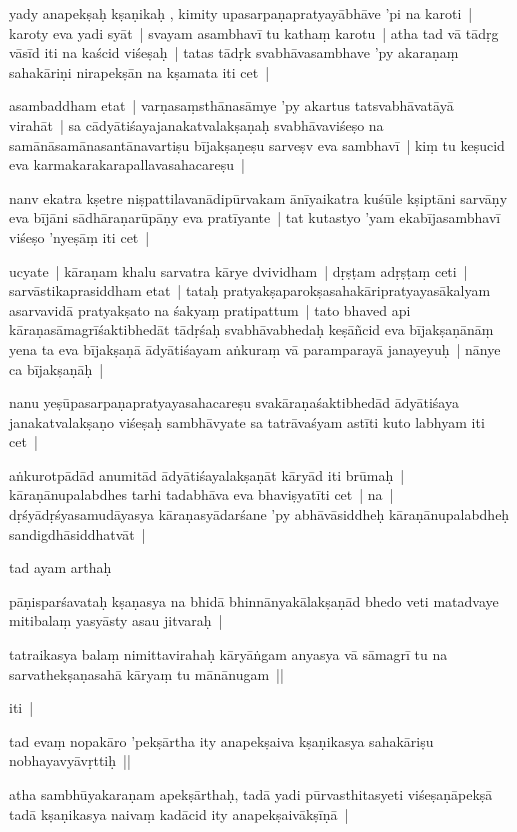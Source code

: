 \documentclass[article,12pt,a4paper]{memoir}
\begin{document}
	  \pstart yady anapekṣaḥ kṣaṇikaḥ , kimity upasarpaṇapratyayābhāve 'pi na karoti | karoty eva yadi syāt | svayam asambhavī tu kathaṃ karotu | atha tad vā tādṛg vāsīd iti na kaścid viśeṣaḥ | tatas tādṛk svabhāvasambhave 'py akaraṇaṃ sahakāriṇi nirapekṣān na kṣamata iti cet |
	\pend
      

	  \pstart asambaddham etat | varṇasaṃsthānasāmye 'py akartus tatsvabhāvatāyā virahāt | sa cādyātiśayajanakatvalakṣaṇaḥ svabhāvaviśeṣo na samānāsamānasantānavartiṣu bījakṣaṇeṣu sarveṣv eva sambhavī | kiṃ tu keṣucid eva karmakarakarapallavasahacareṣu |
	\pend
      

	  \pstart nanv ekatra kṣetre niṣpattilavanādipūrvakam ānīyaikatra kuśūle kṣiptāni sarvāṇy eva bījāni sādhāraṇarūpāṇy eva pratīyante | tat kutastyo 'yam ekabījasambhavī viśeṣo 'nyeṣāṃ iti cet | 
	\pend
      

	  \pstart ucyate | kāraṇam khalu sarvatra kārye dvividham | dṛṣṭam adṛṣṭaṃ ceti | sarvāstikaprasiddham etat | tataḥ pratyakṣaparokṣasahakāripratyayasākalyam asarvavidā pratyakṣato na śakyaṃ pratipattum | tato bhaved api kāraṇasāmagrīśaktibhedāt tādṛśaḥ svabhāvabhedaḥ keṣāñcid eva bījakṣaṇānāṃ yena ta eva bījakṣaṇā ādyātiśayam aṅkuraṃ vā paramparayā janayeyuḥ | nānye ca bījakṣaṇāḥ |
	\pend
      

	  \pstart nanu yeṣūpasarpaṇapratyayasahacareṣu svakāraṇaśaktibhedād ādyātiśaya janakatvalakṣaṇo viśeṣaḥ sambhāvyate sa tatrāvaśyam astīti kuto labhyam iti cet | 
	\pend
      

	  \pstart aṅkurotpādād anumitād ādyātiśayalakṣaṇāt kāryād iti brūmaḥ | kāraṇānupalabdhes tarhi tadabhāva eva bhaviṣyatīti cet | na | dṛśyādṛśyasamudāyasya kāraṇasyādarśane 'py abhāvāsiddheḥ kāraṇānupalabdheḥ sandigdhāsiddhatvāt |
	\pend
      

	  \pstart tad ayam arthaḥ 
	\pend
      

	  \pstart pāṇisparśavataḥ kṣaṇasya na bhidā bhinnānyakālakṣaṇād bhedo veti matadvaye mitibalaṃ yasyāsty asau jitvaraḥ |
	\pend
      

	  \pstart tatraikasya balaṃ nimittavirahaḥ kāryāṅgam anyasya vā sāmagrī tu na sarvathekṣaṇasahā kāryaṃ tu mānānugam || 
	\pend
      

	  \pstart iti |
	\pend
      

	  \pstart tad evaṃ nopakāro 'pekṣārtha ity anapekṣaiva kṣaṇikasya sahakāriṣu nobhayavyāvṛttiḥ ||
	\pend
      

	  \pstart atha sambhūyakaraṇam apekṣārthaḥ, tadā yadi pūrvasthitasyeti viśeṣaṇāpekṣā tadā kṣaṇikasya naivaṃ kadācid ity anapekṣaivākṣīṇā |
	\pend
      
\end{document}
